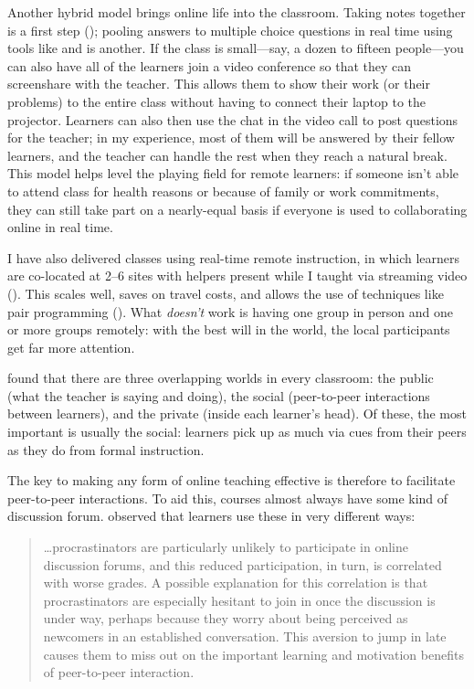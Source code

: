 Another hybrid model brings online life into the classroom.
Taking notes together is a first step ();
pooling answers to multiple choice questions in real time
using tools like 
and  is another.
If the class is small---say, a dozen to fifteen people---you can also
have all of the learners join a video conference
so that they can screenshare with the teacher.
This allows them to show their work (or their problems) to the entire class
without having to connect their laptop to the projector.
Learners can also then use the chat in the video call to post questions for the teacher;
in my experience,
most of them will be answered by their fellow learners,
and the teacher can handle the rest when they reach a natural break.
This model helps level the playing field for remote learners:
if someone isn't able to attend class for health reasons
or because of family or work commitments,
they can still take part on a nearly-equal basis
if everyone is used to collaborating online in real time.

I have also delivered classes using real-time remote instruction,
in which learners are co-located at 2--6 sites with helpers present
while I taught via streaming video ().
This scales well,
saves on travel costs,
and allows the use of techniques like pair programming ().
What \emph{doesn't} work is having one group in person and one or more groups remotely:
with the best will in the world,
the local participants get far more attention.


\cite{Nuth2007} found that there are three overlapping worlds in every classroom:
the public (what the teacher is saying and doing),
the social (peer-to-peer interactions between learners),
and the private (inside each learner's head).
Of these,
the most important is usually the social:
learners pick up as much via cues from their peers as they do from formal instruction.

The key to making any form of online teaching effective is therefore
to facilitate peer-to-peer interactions.
To aid this,
courses almost always have some kind of discussion forum.
\cite{Mill2016a} observed that learners use these in very different ways:

\begin{quote}

  {\ldots}procrastinators are particularly unlikely to participate in online discussion forums,
  and this reduced participation,
  in turn,
  is correlated with worse grades.
  A possible explanation for this correlation is that
  procrastinators are especially hesitant to join in once the discussion is under way,
  perhaps because they worry about being perceived as newcomers in an established conversation.
  This aversion to jump in late
  causes them to miss out on the important learning and motivation benefits of peer-to-peer interaction.

\end{quote}


